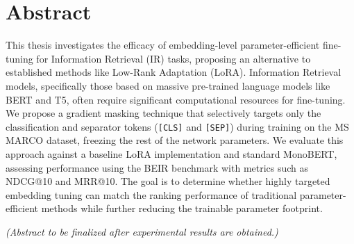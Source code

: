 \chapter*{Abstract}

This thesis investigates the efficacy of embedding-level parameter-efficient fine-tuning for Information Retrieval (IR) tasks, proposing an alternative to established methods like Low-Rank Adaptation (LoRA). Information Retrieval models, specifically those based on massive pre-trained language models like BERT and T5, often require significant computational resources for fine-tuning. We propose a gradient masking technique that selectively targets only the classification and separator tokens (\texttt{[CLS]} and \texttt{[SEP]}) during training on the MS MARCO dataset, freezing the rest of the network parameters. We evaluate this approach against a baseline LoRA implementation and standard MonoBERT, assessing performance using the BEIR benchmark with metrics such as NDCG@10 and MRR@10. The goal is to determine whether highly targeted embedding tuning can match the ranking performance of traditional parameter-efficient methods while further reducing the trainable parameter footprint.

\textit{(Abstract to be finalized after experimental results are obtained.)}

